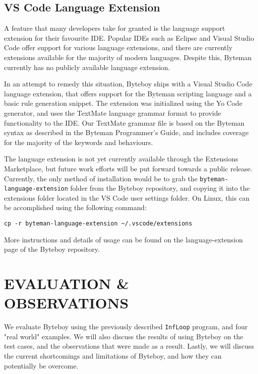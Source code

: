 \documentclass[letterpaper,twocolumn,10pt]{article}
\begin{document}
\subsection{VS Code Language Extension}

A feature that many developers take for granted is the language support extension for their favourite IDE. Popular IDEs such as Eclipse and Visual Studio Code offer support for various language extensions, and there are currently extensions available for the majority of modern languages. Despite this, Byteman currently has no publicly available language extension. 

In an attempt to remedy this situation, Byteboy ships with a Visual Studio Code language extension, that offers support for the Byteman scripting language and a basic rule generation snippet. The extension was initialized using the Yo Code generator\cite{yocode}, and uses the TextMate language grammar format\cite{textmate} to provide functionality to the IDE. Our TextMate grammar file is based on the Byteman syntax as described in the Byteman Programmer's Guide\cite{bytemanguide}, and includes coverage for the majority of the keywords and behaviours.

The language extension is not yet currently available through the Extensions Marketplace, but future work efforts will be put forward towards a public release. Currently, the only method of installation would be to grab the {\tt byteman-language-extension} folder from the Byteboy repository\cite{byteboy}, and copying it into the extensions folder located in the VS Code user settings folder. On Linux, this can be accomplished using the following command: 
\begin{center}
{\tt cp -r byteman-language-extension \textasciitilde/.vscode/extensions}
\end{center}
More instructions and details of usage can be found on the language-extension page of the Byteboy repository\cite{bytemanextension}.

\section{EVALUATION \& OBSERVATIONS}

We evaluate Byteboy using the previously described {\tt InfLoop} program, and four "real world" examples. We will also discuss the results of using Byteboy on the test cases, and the observations that were made as a result. Lastly, we will discuss the current shortcomings and limitations of Byteboy, and how they can potentially be overcome.
\end{document}
